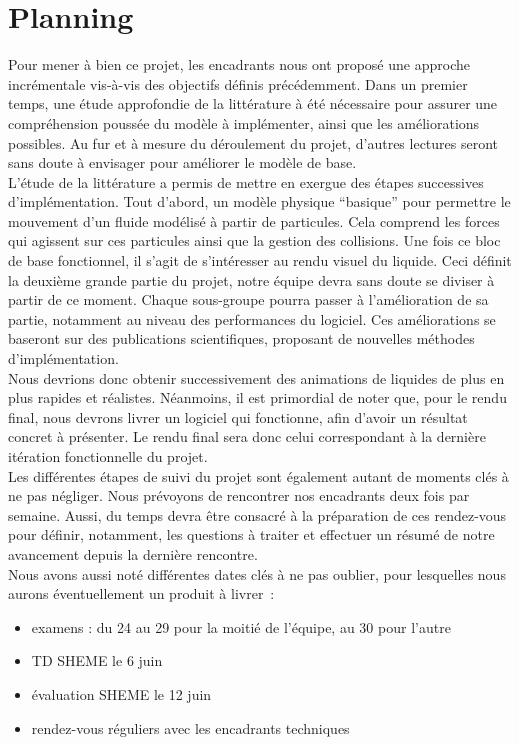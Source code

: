 \documentclass[a4paper,11pt]{article}
\begin{document}
\section{Planning}

Pour mener à bien ce projet, les encadrants nous ont proposé une approche incrémentale vis-à-vis des objectifs définis précédemment. Dans un premier temps, une étude approfondie de la littérature à été nécessaire pour assurer une compréhension poussée du modèle à implémenter, ainsi que les améliorations possibles. Au fur et à mesure du déroulement du projet, d'autres lectures seront sans doute à envisager pour améliorer le modèle de base.\\

L'étude de la littérature a permis de mettre en exergue des étapes successives d'implémentation. Tout d'abord, un modèle physique ``basique'' pour permettre le mouvement d'un fluide modélisé à partir de particules. Cela comprend les forces qui agissent sur ces particules ainsi que la gestion des collisions. Une fois ce bloc de base fonctionnel, il s'agit de s'intéresser au rendu visuel du liquide. Ceci définit la deuxième grande partie du projet, notre équipe devra sans doute se diviser à partir de ce moment. Chaque sous-groupe pourra passer à l'amélioration de sa partie, notamment au niveau des performances du logiciel. Ces améliorations se baseront sur des publications scientifiques, proposant de nouvelles méthodes d'implémentation.\\

Nous devrions donc obtenir successivement des animations de liquides de plus en plus rapides et réalistes. Néanmoins, il est primordial de noter que, pour le rendu final, nous devrons livrer un logiciel qui fonctionne, afin d'avoir un résultat concret à présenter. Le rendu final sera donc celui correspondant à la dernière itération fonctionnelle du projet.\\

Les différentes étapes de suivi du projet sont également autant de moments clés à ne pas négliger. Nous prévoyons de rencontrer nos encadrants deux fois par semaine. Aussi, du temps devra être consacré à la préparation de ces rendez-vous pour définir, notamment, les questions à traiter et effectuer un résumé de notre avancement depuis la dernière rencontre. \\

Nous avons aussi noté différentes dates clés à ne pas oublier, pour lesquelles nous aurons éventuellement un produit à livrer~:
\begin{itemize}
\item examens : du 24 au 29 pour la moitié de l'équipe, au 30 pour l'autre
\item TD SHEME le 6 juin
\item évaluation SHEME le 12 juin
\item rendez-vous réguliers avec les encadrants techniques
\end{itemize}
\end{document}
